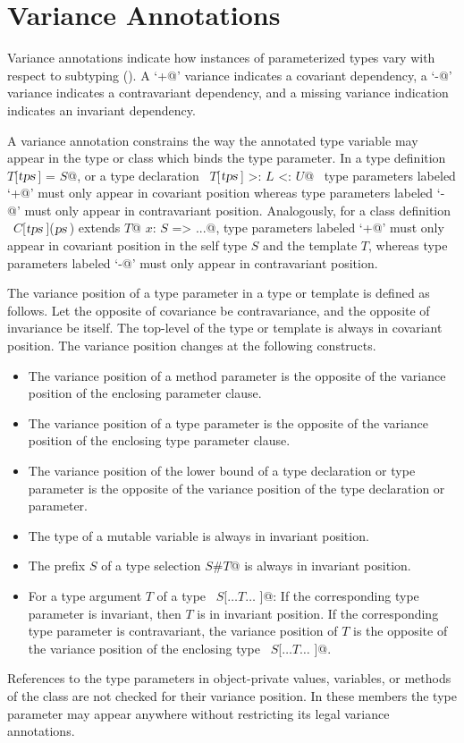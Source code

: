 \section{Variance Annotations}\label{sec:variances}

Variance annotations indicate how instances of parameterized types
vary with respect to subtyping ().  A
`\lstinline@+@' variance indicates a covariant dependency, a
`\lstinline@-@' variance indicates a contravariant dependency, and a
missing variance indication indicates an invariant dependency.

A variance annotation constrains the way the annotated type variable
may appear in the type or class which binds the type parameter.  In a
type definition ~\lstinline@type $T$[$\mbox{\sl tps}\,$] = $S$@, or a type 
declaration ~\lstinline@type $T$[$\mbox{\sl tps}\,$] >: $L$ <: $U$@~ type parameters labeled
`\lstinline@+@' must only appear in covariant position whereas
type parameters labeled `\lstinline@-@' must only appear in contravariant
position. Analogously, for a class definition
~\lstinline@class $C$[$\mbox{\sl tps}\,$]($\mbox{\sl ps}\,$) extends $T$@ { $x$: $S$ => ...}@, 
type parameters labeled
`\lstinline@+@' must only appear in covariant position in the
self type $S$ and the template $T$, whereas type
parameters labeled `\lstinline@-@' must only appear in contravariant
position. 

The variance position of a type parameter in a type or template is
defined as follows.  Let the opposite of covariance be contravariance,
and the opposite of invariance be itself.  The top-level of the type
or template is always in covariant position. The variance position
changes at the following constructs.
\begin{itemize}
\item
The variance position of a method parameter is the opposite of the 
variance position of the enclosing parameter clause.
\item
The variance position of a type parameter is the opposite of the
variance position of the enclosing type parameter clause.
\item
The variance position of the lower bound of a type declaration or type parameter 
is the opposite of the variance position of the type declaration or parameter.  
\item
The type of a mutable variable is always in invariant position.
\item 
The prefix $S$ of a type selection \lstinline@$S$#$T$@ is always in invariant position.
\item
For a type argument $T$ of a type ~\lstinline@$S$[$\ldots T \ldots$ ]@: If the
corresponding type parameter is invariant, then $T$ is in
invariant position.  If the corresponding type parameter is
contravariant, the variance position of $T$ is the opposite of
the variance position of the enclosing type ~\lstinline@$S$[$\ldots T \ldots$ ]@.
\end{itemize}
References to the type parameters in object-private values, variables,
or methods of the class are not checked for their variance
position. In these members the type parameter may appear anywhere
without restricting its legal variance annotations.

